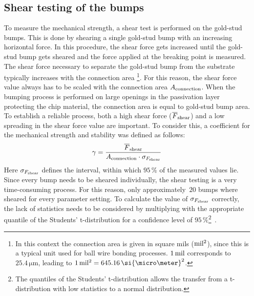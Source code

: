\subsection{Shear testing of the bumps}\label{sec:shear_test}
To measure the mechanical strength, a shear test is performed on the gold-stud bumps. This is done by shearing a single gold-stud bump with an increasing horizontal force. In this procedure, the shear force gets increased until the gold-stud bump gets sheared and the force applied at the breaking point is measured. The shear force necessary to separate the gold-stud bump from the substrate typically increases with the connection area \footnote{In this context the connection area is given in square mils ($\rm{mil^2}$), since this is a typical unit used for ball wire bonding processes. $1\,\rm{mil}$ corresponds to $25.4\,\si{\micro \meter}$, leading to $1\,\rm{mil^2}=645.16\,\si{\micro \meter}^2$.}. For this reason, the shear force value always has to be scaled with the connection area $A_{\rm{connection}}$. When the bumping process is performed on large openings in the passivation layer protecting the chip material, the connection area is equal to gold-stud bump area. To establish a reliable process, both a high shear force ($\overline{F}_{\rm{shear}}$) and a low spreading in the shear force value are important. To consider this, a coefficient for the mechanical strength and stability was defined as follows:
\begin{equation}
\gamma = \frac{\overline{F}_{\rm{shear}}}{A_{\rm{connection}} \cdot \sigma_{  F_{\rm{shear}}}}
\end{equation}
Here $\sigma_{  F_{\rm{shear}}}$ defines the interval, within which $95\,\%$ of the measured values lie. Since every bump needs to be sheared individually, the shear testing is a very time-consuming process. For this reason, only approximately~$20$ bumps where sheared for every parameter setting. To calculate the value of $\sigma_{F_{\rm{shear}}}$ correctly, the lack of statistics needs to be considered by multiplying with the appropriate quantile of the Students' t-distribution for a confidence level of $95\,\%$\footnote{The quantiles of the Students' t-distribution allows the transfer from a t-distribution with low statistics to a normal distribution.}~\cite{Sha06}.

